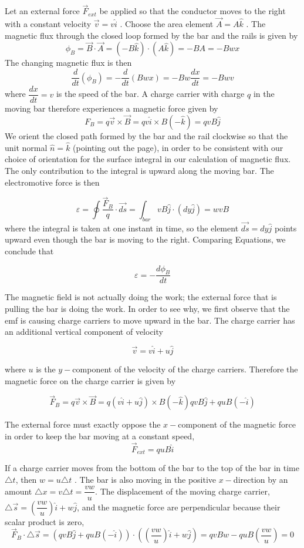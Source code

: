 \documentclass{article}
\begin{document}
Let an external force  $ \vec{F}_{ext} $ be applied so that the conductor moves to the right with a constant velocity $ \vec{v} = v\hat{i}$  . Choose the area element $ \vec{A} = A\hat{k} $ . The magnetic flux through the closed loop formed by the bar and the rails is given by
\[\phi_{B} = \vec{B}\cdot \vec{A} = (-B\hat{k})\cdot (A\hat{k}) = -BA=-Bwx\]
The changing magnetic flux is then
\[ \dfrac{d}{dt}(\phi_{B}) = -\dfrac{d}{dt}(Bwx) = -Bw\dfrac{dx}{dt}=-Bwv\]
where $ \dfrac{dx}{dt} = v $ is the speed of the bar. A charge carrier with charge $ q $ in the moving bar therefore experiences a magnetic force given by
\[F_{B} = q\vec{v}\times\vec{B} = qv\hat{i}\times B(-\hat{k})= qvB\hat{j}\]
We orient the closed path formed by the bar and the rail clockwise so that the unit normal $ \hat{n} = \hat{k} $ (pointing out the page), in order to be consistent with our choice of orientation for the surface integral in our calculation of magnetic flux. The only contribution to the integral is upward along the moving bar. The electromotive force is then

\[\varepsilon = \oint \dfrac{\vec{F}_{B}}{q}\cdot \vec{ds} = \int_{bar} vB\hat{j}\cdot(dy\hat{j}) = wvB \]
where the integral is taken at one instant in time, so the element $ \vec{ds} = dy\hat{j} $ points upward
even though the bar is moving to the right. Comparing Equations, we conclude that

\[\varepsilon = - \dfrac{d\phi_{B}}{dt}\]

The magnetic field is not actually doing the work; the external force that is pulling the bar is doing the work. In order to see why, we first observe that the emf is causing charge carriers to move upward in the bar. The charge carrier has an additional vertical component of velocity

\[\vec{v} = v\hat{i} + u\hat{j}\]

where $ u $ is the $y -$component of the velocity of the charge carriers. Therefore the magnetic force on the charge carrier is given by

\[ \vec{F}_{B}= q\vec{v}\times \vec{B} = q(v\hat{i} + u\hat{j})\times B(-\hat{k}) qvB\hat{j} + quB(-\hat{i})\]

The external force must exactly oppose the $ x- $component of the magnetic force in order
to keep the bar moving at a constant speed,
\[\vec{F}_{ext} = quB\hat{i}\]

If a charge carrier moves from the bottom of the bar to the top of the bar in time $ \triangle t $, then $w = u\triangle t$ . The bar is also moving in the positive $ x- $direction by an amount $\triangle x = v\triangle t = \dfrac{vw}{u} $. The displacement of the moving charge carrier, $ \triangle\vec{s} = (\dfrac{vw}{u})\hat{i} + w\hat{j}$, and the magnetic force are perpendicular because their scalar product is zero,
\[ \vec{F}_{B}\cdot \triangle \vec{s} = (qvB\hat{j} + quB(-\hat{i}))\cdot ((\dfrac{vw}{u})\hat{i} + w\hat{j}) = qvBw - quB(\dfrac{vw}{u}) = 0\]
\end{document}
